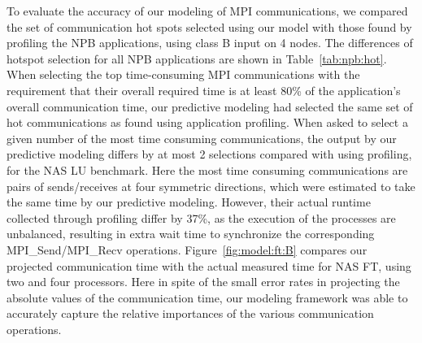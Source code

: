 To evaluate the accuracy of our modeling of MPI communications,
  we compared the set of communication hot spots selected using our model with those found by profiling
  the NPB applications, using class B input on 4 nodes.
The differences of hotspot selection for all NPB applications are shown in Table~\ref{tab:npb:hot}.
When selecting the top time-consuming MPI communications with the requirement that their overall required time is at least 80\% of the application's overall communication time,
our predictive modeling had selected the same set of hot communications as found using application profiling.
When asked to select a given number of the most time consuming communications, the output by our predictive modeling differs by at most 2 selections compared with using profiling,
for the NAS LU benchmark.
Here the most time consuming communications are pairs of sends/receives at four symmetric directions, which were estimated to take the same time by our predictive modeling.
However, their actual runtime collected through profiling differ by 37\%, as the execution of the processes are unbalanced, resulting in extra wait time to synchronize the corresponding MPI\_Send/MPI\_Recv operations.
Figure~\ref{fig:model:ft:B} compares our projected communication time with the actual measured time for NAS FT, using two and four processors.  Here in spite of the small error rates in projecting the absolute values of the communication time, our modeling framework was able to accurately capture the relative importances of the various communication operations.



